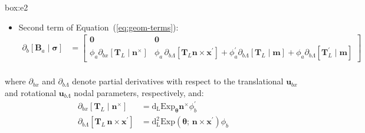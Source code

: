 \begin{ambox}[E2]{box:e2}
\begin{enumerate}
\begin{itemize}
\begin{equation*}
\begin{aligned}
   \end{aligned}
   \end{equation*}
  \item Second term of Equation~(\ref{eq:geom-terms}): %
\begin{equation*} 
   \begin{aligned}
   \partial_b\left[\bm{B}_a\mid\bm{\sigma}\right]
   &= \begin{bmatrix}
   \mathbf{0} & \mathbf{0} \\
   \phi_a \partial_{b x}[\mathbf{T}_{\scriptscriptstyle{L}} \mid \bm{n}^\times] %
   &\phi_a \,\partial_{b \scriptscriptstyle{\Lambda}}  [\mathbf{T}_{\scriptscriptstyle{L}} \bm{n}\times\bm{x}^{\prime}] 
   + \phi_a^\prime \partial_{b \scriptscriptstyle{\Lambda}}  \left[\mathbf{T}_{\scriptscriptstyle{L}}\mid\bm{m}\right]+ \phi_a\partial_{b \scriptscriptstyle{\Lambda}}  [{\mathbf{T}_{\scriptscriptstyle{L}}^{\prime}}\mid\bm{m}]
   \end{bmatrix}\\
   \end{aligned}
   \end{equation*}
  \end{itemize}
  where \(\partial_{b x}\) and
  \(\partial_{b \scriptscriptstyle{\Lambda}}\) denote partial
  derivatives with respect to the translational \(\bm{u}_{b x}\) and
  rotational \(\bm{u}_{b \scriptscriptstyle{\Lambda}}\) nodal
  parameters, respectively, and: %
\begin{equation*} 
   \begin{aligned}
   \partial_{b x}[\mathbf{T}_{\scriptscriptstyle{L}} \mid \bm{n}^\times]
   &= \operatorname{d_{\scriptscriptstyle{L}}Exp}_{\bm{\theta}}  \bm{n}^\times  \phi_b^{\prime}
   \\
   \partial_{b \scriptscriptstyle{\Lambda}} [\mathbf{T}_{\scriptscriptstyle{L}} \,\bm{n}\times\bm{x}^{\prime}]
   &=
      \operatorname{d^2_{\scriptscriptstyle{L}}Exp}\left(\bm{\theta};\, \bm{n} \times \bm{x}^{\prime}\right) \phi_b

\end{aligned}
\end{equation*}
\end{enumerate}
\end{ambox}
